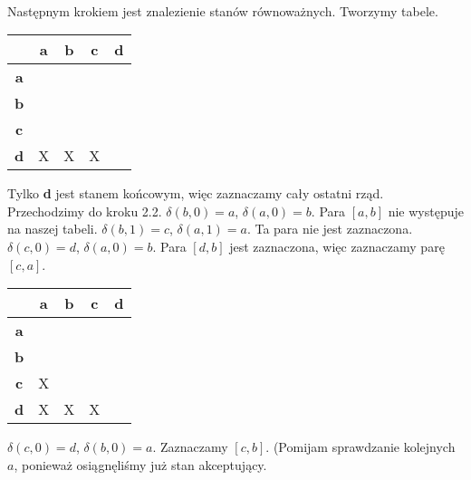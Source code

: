\documentclass[10pt,a4paper, polish]{report}
\begin{document}
\\
Następnym krokiem jest znalezienie stanów równoważnych. Tworzymy tabele.
\begin{table}[H]
    \centering
    \begin{tabular}{|c|c|c|c|c|}
    \hline
    		   & \textbf{a} & \textbf{b} & \textbf{c} & \textbf{d}\\\hline
    \textbf{a}\\\hline
    \textbf{b} & \\\hline
    \textbf{c} & &\\\hline
    \textbf{d} & X & X & X \\\hline
    \end{tabular}
    \label{tab:mytable}
\end{table}
Tylko \textbf{d} jest stanem końcowym, więc zaznaczamy cały ostatni rząd.
Przechodzimy do kroku 2.2. $\delta(b,0) = a$, $\delta(a,0) = b$. Para $[a,b]$ nie występuje na naszej tabeli. $\delta(b,1) = c$, $\delta(a,1) = a$. Ta para nie jest zaznaczona. $\delta(c,0) = d$, $\delta(a,0) = b$. Para $[d,b]$ jest zaznaczona, więc zaznaczamy parę $[c,a]$.
\begin{table}[H]
    \centering
    \begin{tabular}{|c|c|c|c|c|}
    \hline
    		   & \textbf{a} & \textbf{b} & \textbf{c} & \textbf{d}\\\hline
    \textbf{a}\\\hline
    \textbf{b} & \\\hline
    \textbf{c} & X & \\\hline
    \textbf{d} & X & X & X \\\hline
    \end{tabular}
    \label{tab:mytable}
\end{table}
$\delta(c,0) = d$, $\delta(b,0) = a$. Zaznaczamy $[c,b]$. (Pomijam sprawdzanie kolejnych $a$, ponieważ osiągnęliśmy już stan akceptujący. 
\end{document}
